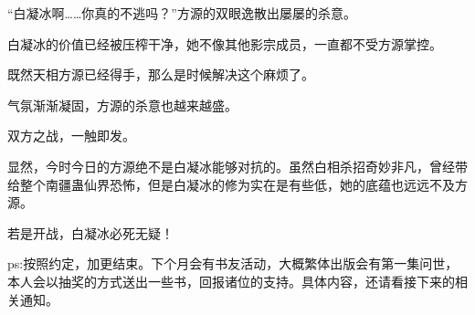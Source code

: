 \begin{this_body}
“白凝冰啊……你真的不逃吗？”方源的双眼逸散出屡屡的杀意。

白凝冰的价值已经被压榨干净，她不像其他影宗成员，一直都不受方源掌控。

既然天相方源已经得手，那么是时候解决这个麻烦了。

气氛渐渐凝固，方源的杀意也越来越盛。

双方之战，一触即发。

显然，今时今日的方源绝不是白凝冰能够对抗的。虽然白相杀招奇妙非凡，曾经带给整个南疆蛊仙界恐怖，但是白凝冰的修为实在是有些低，她的底蕴也远远不及方源。

若是开战，白凝冰必死无疑！

ps:按照约定，加更结束。下个月会有书友活动，大概繁体出版会有第一集问世，本人会以抽奖的方式送出一些书，回报诸位的支持。具体内容，还请看接下来的相关通知。

\end{this_body}

